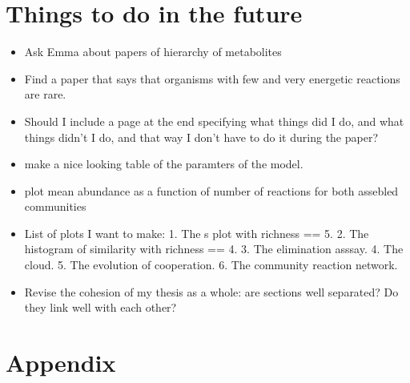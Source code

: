\documentclass[titlepage,11pt]{article}
\begin{document}
\begin{linenumbers}
			\section{Things to do in the future}
			\begin{itemize}
				\item Ask Emma about papers of hierarchy of metabolites
				\item Find a paper that says that organisms with few and very energetic reactions are rare.
				\item Should I include a page at the end specifying what things did I do, and what things didn't I do, and that way I don't have to do it during the paper?
				\item make a nice looking table of the paramters of the model.
				\item plot mean abundance as a function of number of reactions for both assebled communities 
				\item List of plots I want to make: 1. The s plot with richness == 5. 2. The histogram of similarity with richness == 4. 3. The elimination asssay. 4. The cloud. 5. The evolution of cooperation. 6. The community reaction network. 
				\item Revise the cohesion of my thesis as a whole: are sections well separated? Do they link well with each other? 
			\end{itemize}
		\newpage
		\section{Appendix}

\end{linenumbers}
\end{document}
